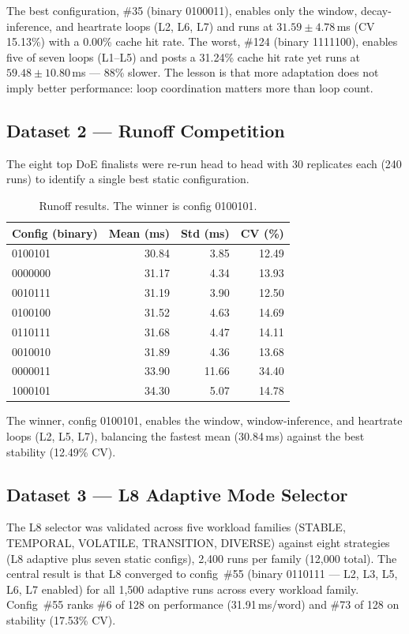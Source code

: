 The best configuration, \#35 (binary 0100011), enables only the window,
decay-inference, and heartrate loops (L2, L6, L7) and runs at
$31.59 \pm 4.78$\,ms (CV 15.13\%) with a 0.00\% cache hit rate. The worst,
\#124 (binary 1111100), enables five of seven loops (L1--L5) and posts a 31.24\%
cache hit rate yet runs at $59.48 \pm 10.80$\,ms --- 88\% slower. The lesson is
that more adaptation does not imply better performance: loop coordination
matters more than loop count.

\subsection{Dataset 2 --- Runoff Competition}

The eight top DoE finalists were re-run head to head with 30 replicates each
(240 runs) to identify a single best static configuration.

\begin{table}[ht]
\centering
\small
\begin{tabular}{lrrr}
\toprule
Config (binary) & Mean (ms) & Std (ms) & CV (\%) \\
\midrule
0100101 & 30.84 & 3.85 & 12.49 \\
0000000 & 31.17 & 4.34 & 13.93 \\
0010111 & 31.19 & 3.90 & 12.50 \\
0100100 & 31.52 & 4.63 & 14.69 \\
0110111 & 31.68 & 4.47 & 14.11 \\
0010010 & 31.89 & 4.36 & 13.68 \\
0000011 & 33.90 & 11.66 & 34.40 \\
1000101 & 34.30 & 5.07 & 14.78 \\
\bottomrule
\end{tabular}
\caption{Runoff results. The winner is config 0100101.}
\end{table}

The winner, config 0100101, enables the window, window-inference, and heartrate
loops (L2, L5, L7), balancing the fastest mean (30.84\,ms) against the best
stability (12.49\% CV).

\subsection{Dataset 3 --- L8 Adaptive Mode Selector}

The L8 selector was validated across five workload families (STABLE, TEMPORAL,
VOLATILE, TRANSITION, DIVERSE) against eight strategies (L8 adaptive plus seven
static configs), 2{,}400 runs per family (12{,}000 total). The central result is
that L8 converged to config~\#55 (binary 0110111 --- L2, L3, L5, L6, L7 enabled)
for all 1{,}500 adaptive runs across every workload family. Config~\#55 ranks
\#6 of 128 on performance (31.91\,ms/word) and \#73 of 128 on stability
(17.53\% CV).

